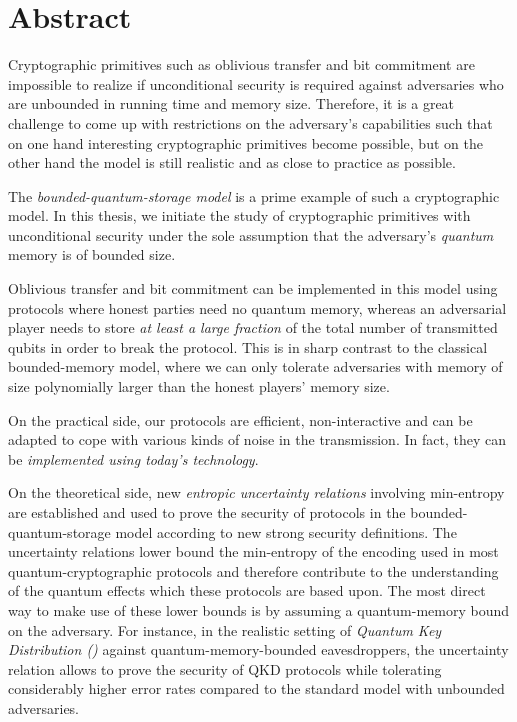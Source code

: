 \chapter*{{\Huge Abstract}}

Cryptographic primitives such as oblivious transfer and bit commitment
are impossible to realize if unconditional security is required against
adversaries who are unbounded in running time and memory size.
Therefore, it is a great challenge to come up with restrictions on the
adversary's capabilities such that on one hand interesting
cryptographic primitives become possible, but on the other hand the
model is still realistic and as close to practice as possible.

The \emph{bounded-quantum-storage model} is a prime example of
such a cryptographic model. In this thesis, we initiate the study of
cryptographic primitives with unconditional security under the sole
assumption that the adversary's {\em quantum} memory is of bounded
size.

Oblivious transfer and bit commitment can be implemented in this model
using protocols where honest parties need no quantum memory, whereas
an adversarial player needs to store \emph{at least a large fraction} of the
total number of transmitted qubits in order to break the protocol.
This is in sharp contrast to the classical bounded-memory model, where
we can only tolerate adversaries with memory of size polynomially
larger than the honest players' memory size.

On the practical side, our protocols are efficient, non-interactive
and can be adapted to cope with various kinds of noise in the
transmission. In fact, they can be \emph{implemented using today's
technology}. 

On the theoretical side, new \emph{entropic uncertainty relations}
involving min-entropy are established and used to prove the security
of protocols in the bounded-quantum-storage model according to new
strong security definitions. The uncertainty relations lower bound
the min-entropy of the encoding used in most quantum-cryptographic
protocols and therefore contribute to the understanding of the quantum
effects which these protocols are based upon. The most direct way to
make use of these lower bounds is by assuming a quantum-memory bound on
the adversary. For instance, in the realistic setting of \emph{Quantum
  Key Distribution (\QKD)} against quantum-memory-bounded
eavesdroppers, the uncertainty relation allows to prove the security
of QKD protocols while tolerating considerably higher error rates
compared to the standard model with unbounded adversaries. %

